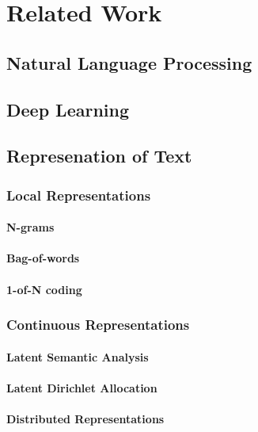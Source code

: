 
\chapter{Related Work}
\label{chap:related_work}

\section{Natural Language Processing}
\label{sec:rel_nlp}

\section{Deep Learning}
\label{sec:deep_learning}


\section{Represenation of Text}
\label{sec:rel_represenation_text}



\subsection{Local Representations}
\label{sec:rel_local_representation}

\subsubsection{N-grams}
\label{sec:sub_ngrams}

\subsubsection{Bag-of-words}
\label{sec:rel_bow}

\subsubsection{1-of-N coding}
\label{sec:1_of_coding}

\subsection{Continuous Representations}
\label{sec:sub_continuous_representation}

\subsubsection{Latent Semantic Analysis}
\label{sec:rel_local_representation}

\subsubsection{Latent Dirichlet Allocation}
\label{sec:rel_lda}

\subsubsection{Distributed Representations}
\label{sec:dis_rep}






